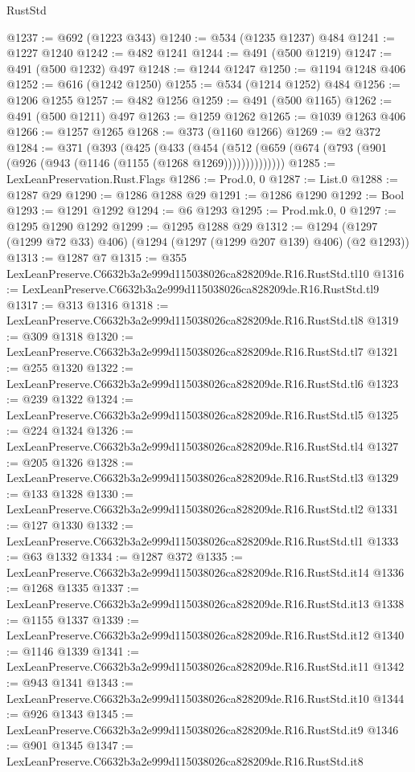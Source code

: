 \begin{lexlean}{RustStd}
\begin{coremodule}
@1237 := @692 (@1223 @343)
@1240 := @534 (@1235 @1237) @484
@1241 := @1227 @1240
@1242 := @482 @1241
@1244 := @491 (@500 @1219)
@1247 := @491 (@500 @1232) @497
@1248 := @1244 @1247
@1250 := @1194 @1248 @406
@1252 := @616 (@1242 @1250)
@1255 := @534 (@1214 @1252) @484
@1256 := @1206 @1255
@1257 := @482 @1256
@1259 := @491 (@500 @1165)
@1262 := @491 (@500 @1211) @497
@1263 := @1259 @1262
@1265 := @1039 @1263 @406
@1266 := @1257 @1265
@1268 := @373 (@1160 @1266)
@1269 := @2 @372
@1284 := @371
    (@393
      (@425
        (@433
          (@454 (@512 (@659 (@674 (@793 (@901 (@926 (@943 (@1146 (@1155 (@1268 @1269))))))))))))))
@1285 := LexLeanPreservation.Rust.Flags
@1286 := Prod.{0, 0}
@1287 := List.{0}
@1288 := @1287 @29
@1290 := @1286 @1288 @29
@1291 := @1286 @1290
@1292 := Bool
@1293 := @1291 @1292
@1294 := @6 @1293
@1295 := Prod.mk.{0, 0}
@1297 := @1295 @1290 @1292
@1299 := @1295 @1288 @29
@1312 := @1294 (@1297 (@1299 @72 @33) @406) (@1294 (@1297 (@1299 @207 @139) @406) (@2 @1293))
@1313 := @1287 @7
@1315 := @355 LexLeanPreserve.C6632b3a2e999d115038026ca828209de.R16.RustStd.tl10
@1316 := LexLeanPreserve.C6632b3a2e999d115038026ca828209de.R16.RustStd.tl9
@1317 := @313 @1316
@1318 := LexLeanPreserve.C6632b3a2e999d115038026ca828209de.R16.RustStd.tl8
@1319 := @309 @1318
@1320 := LexLeanPreserve.C6632b3a2e999d115038026ca828209de.R16.RustStd.tl7
@1321 := @255 @1320
@1322 := LexLeanPreserve.C6632b3a2e999d115038026ca828209de.R16.RustStd.tl6
@1323 := @239 @1322
@1324 := LexLeanPreserve.C6632b3a2e999d115038026ca828209de.R16.RustStd.tl5
@1325 := @224 @1324
@1326 := LexLeanPreserve.C6632b3a2e999d115038026ca828209de.R16.RustStd.tl4
@1327 := @205 @1326
@1328 := LexLeanPreserve.C6632b3a2e999d115038026ca828209de.R16.RustStd.tl3
@1329 := @133 @1328
@1330 := LexLeanPreserve.C6632b3a2e999d115038026ca828209de.R16.RustStd.tl2
@1331 := @127 @1330
@1332 := LexLeanPreserve.C6632b3a2e999d115038026ca828209de.R16.RustStd.tl1
@1333 := @63 @1332
@1334 := @1287 @372
@1335 := LexLeanPreserve.C6632b3a2e999d115038026ca828209de.R16.RustStd.it14
@1336 := @1268 @1335
@1337 := LexLeanPreserve.C6632b3a2e999d115038026ca828209de.R16.RustStd.it13
@1338 := @1155 @1337
@1339 := LexLeanPreserve.C6632b3a2e999d115038026ca828209de.R16.RustStd.it12
@1340 := @1146 @1339
@1341 := LexLeanPreserve.C6632b3a2e999d115038026ca828209de.R16.RustStd.it11
@1342 := @943 @1341
@1343 := LexLeanPreserve.C6632b3a2e999d115038026ca828209de.R16.RustStd.it10
@1344 := @926 @1343
@1345 := LexLeanPreserve.C6632b3a2e999d115038026ca828209de.R16.RustStd.it9
@1346 := @901 @1345
@1347 := LexLeanPreserve.C6632b3a2e999d115038026ca828209de.R16.RustStd.it8

\end{coremodule}
\end{lexlean}
